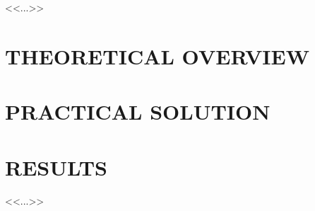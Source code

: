 \documentclass[a4paper,12pt]{extarticle} %
\begin{document}
    
    \pagebreak

    
    \pagebreak

    \tableofcontents{}
    \pagebreak

    <<...>>

    \newpage
    \section{THEORETICAL OVERVIEW}
    

    \newpage
    \section{PRACTICAL SOLUTION}
    

    \newpage
    \section{RESULTS}
    

    \newpage
    <<...>>

    \printbibliography
\end{document}
